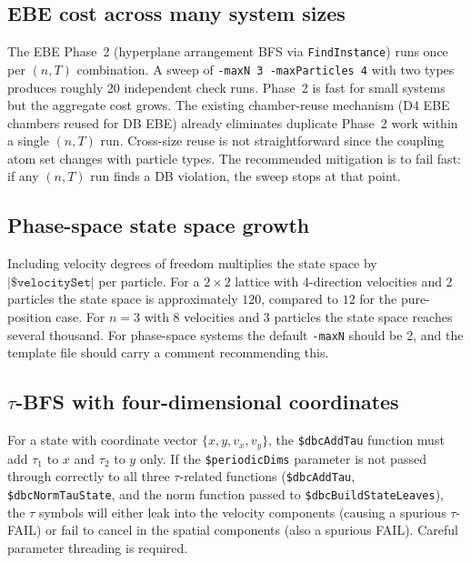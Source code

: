 \documentclass[12pt,a4paper]{article}
\begin{document}
\subsection{EBE cost across many system sizes}
The EBE Phase~2 (hyperplane arrangement BFS via
\texttt{FindInstance}) runs once per $(n, T)$ combination.  A sweep of
\texttt{-maxN 3 -maxParticles 4} with two types produces roughly 20
independent check runs.  Phase~2 is fast for small systems but the aggregate
cost grows.  The existing chamber-reuse mechanism (D4 EBE chambers reused for
DB EBE) already eliminates duplicate Phase~2 work within a single $(n, T)$
run.  Cross-size reuse is not straightforward since the coupling atom set
changes with particle types.  The recommended mitigation is to fail fast: if
any $(n, T)$ run finds a DB violation, the sweep stops at that point.

\subsection{Phase-space state space growth}
Including velocity degrees of freedom multiplies the state space by
$|\texttt{\$velocitySet}|$ per particle.  For a $2 \times 2$ lattice with
4-direction velocities and 2 particles the state space is approximately
$120$, compared to $12$ for the pure-position case.  For $n = 3$ with 8
velocities and 3 particles the state space reaches several thousand.  For
phase-space systems the default \texttt{-maxN} should be 2, and the template
file should carry a comment recommending this.

\subsection{\texorpdfstring{$\tau$}{Tau}-BFS with four-dimensional coordinates}
For a state with coordinate vector $\{x, y, v_x, v_y\}$, the
\texttt{\$dbcAddTau} function must add $\tau_1$ to $x$ and $\tau_2$ to $y$
only.  If the \texttt{\$periodicDims} parameter is not passed through correctly
to all three $\tau$-related functions (\texttt{\$dbcAddTau},
\texttt{\$dbcNormTauState}, and the norm function passed to
\texttt{\$dbcBuildStateLeaves}), the $\tau$ symbols will either leak into the
velocity components (causing a spurious $\tau$-FAIL) or fail to cancel in the
spatial components (also a spurious FAIL).  Careful parameter threading is
required.
\end{document}
